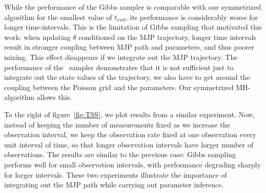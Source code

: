 While the performance of the Gibbs sampler is comparable with our symmetrized algorithm for the smallest value of $t_{end}$, its performance is considerably worse for longer time-intervals.  
This is the limitation of Gibbs sampling that motivated this work: when updating $\theta$ conditioned on the MJP trajectory, longer time intervals result in stronger coupling between MJP path and parameters, and thus poorer mixing. 
This effect disappears if we integrate out the MJP trajectory. 
The performance of the \naive\ sampler demonstrates that it is not sufficient just to integrate out the state values of the trajectory, we also have to get around the coupling between the Poisson grid and the parameters. 
Our symmetrized MH-algorithm allows this. 


To the right of figure~\ref{fig:TSS}, we plot results from a similar experiment. 
Now, instead of keeping the number of measurements fixed as we increase the observation interval, we keep the observation rate fixed at one observation every unit interval of time, so that longer observation intervals have larger number of observations. 
The results are similar to the previous case: Gibbs sampling performs well for small observation intervals, with performance degrading sharply for larger intervals. 
These two experiments illustrate the importance of integrating out the MJP path while carrying out parameter inference.

